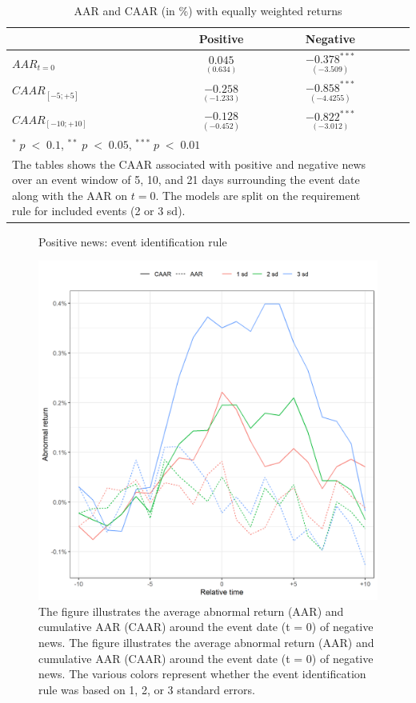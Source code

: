 \begin{table}[H]
\centering
\caption{AAR and CAAR (in \%) with equally weighted returns} 
\begin{tabular}{lcccc}
  \hline  \hline
  & \multicolumn{1}{c}{Positive} &  \multicolumn{1}{c}{Negative}\\  
 \hline
$AAR_{t=0}$ &  $\underset{(0.634)}{0.045}$ & $\underset{(-3.509)}{-0.378^{***}}$ \\  
$CAAR_{[-5;+5]}$  & $\underset{(-1.233)}{-0.258}$ & $\underset{(-4.4255)}{-0.858^{***}}$ \\ 
$CAAR_{[-10;+10]}$    & $\underset{(-0.452)}{-0.128 }$ & $\underset{(-3.012)}{-0.822^{***}}$ \\ 
   \hline \hline
   \multicolumn{3}{p{10cm}}{ \footnotesize $^* \; p\; <\; 0.1$, $ ^{**} \; p\; <\; 0.05$, $ ^{***} \; p\; <\; 0.01$  } \\
   \multicolumn{3}{p{10cm}}{\footnotesize The tables shows the CAAR associated with positive and negative news over an event window of 5, 10, and 21 days surrounding the event date along with the AAR on $t=0$. The models are split on the requirement rule for included events (2 or 3 sd).} \\
   \hline
\end{tabular}
\label{tab:ST_sensitivity_weights}
\end{table}


\begin{figure} [H]
    \centering
    \caption{Positive news: event identification rule}
    \includegraphics[scale=0.6]{Projekt/1.Figures analysis/ST_positive_sensitivity.png}
     \caption*{\footnotesize The figure illustrates the average abnormal return (AAR) and cumulative AAR (CAAR) around the event date (t = 0) of negative news. The figure illustrates the average abnormal return (AAR) and cumulative AAR (CAAR) around the event date (t = 0) of negative news. The various colors represent whether the event identification rule was based on 1, 2, or 3 standard errors. }
    \label{fig:ST_pos_sensi_sd}
\end{figure} 

